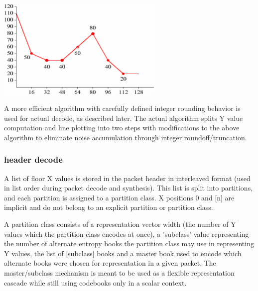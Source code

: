 \begin{center}
\includegraphics[width=8cm]{floor1-4}
\end{center}

A more efficient algorithm with carefully defined integer rounding
behavior is used for actual decode, as described later.  The actual
algorithm splits Y value computation and line plotting into two steps
with modifications to the above algorithm to eliminate noise
accumulation through integer roundoff/truncation.



\subsubsection{header decode}

A list of floor X values is stored in the packet header in interleaved
format (used in list order during packet decode and synthesis).  This
list is split into partitions, and each partition is assigned to a
partition class.  X positions 0 and [n] are implicit and do not belong
to an explicit partition or partition class.

A partition class consists of a representation vector width (the
number of Y values which the partition class encodes at once), a
'subclass' value representing the number of alternate entropy books
the partition class may use in representing Y values, the list of
[subclass] books and a master book used to encode which alternate
books were chosen for representation in a given packet.  The
master/subclass mechanism is meant to be used as a flexible
representation cascade while still using codebooks only in a scalar
context.

